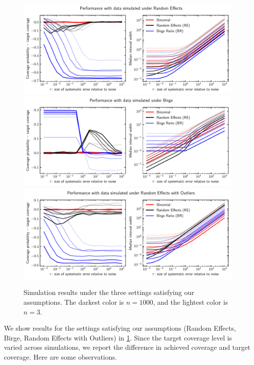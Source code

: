 \documentclass[12pt]{article}
\begin{document}
\begin{figure}[h]
\centering
\includegraphics[width=\textwidth]{figs/performance_random_effects.pdf}
\includegraphics[width=\textwidth]{figs/performance_birge.pdf}
\includegraphics[width=\textwidth]{figs/performance_random_effects_outliers.pdf}
\label{fig:sim-results}
\caption{Simulation results under the three settings satisfying our assumptions. The darkest color is $n=1000$, and the lightest color is $n=3$.}
\end{figure}

We show results for the settings satisfying our assumptions (Random Effects, Birge, Random Effects with Outliers) in \ref{fig:sim-results}. Since the target coverage level is varied across simulations, we report the difference in achieved coverage and target coverage. Here are some observations.
\end{document}
